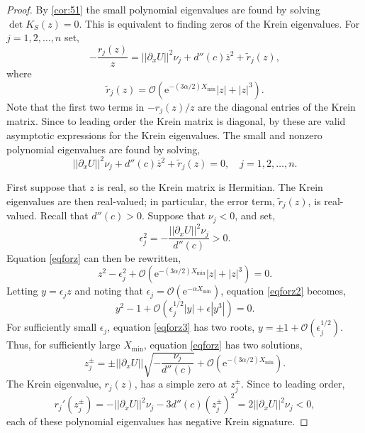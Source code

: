 \documentclass[review,onefignum,onetabnum]{siamart171218}
\def\det{\mathop\mathrm{det}\nolimits}
\newcommand{\rme}{\mathrm{e}}
\newcommand{\vK}{\bm{\mathit{K}}}
\begin{document}

\begin{proof}
By \cref{cor:51} the small polynomial eigenvalues are found by solving $\det\vK_S(z) = 0$. This is equivalent to finding zeros of the Krein eigenvalues. For $j=1,2,\dots,n$ set,
\[
-\frac{r_j(z)}{z}=||\partial_xU||^2 \nu_j + d''(c) \overline{z}^2+\tilde{r}_j(z),
\]
where
\[
\tilde{r}_j(z) = \mathcal{O}(\rme^{-(3 \alpha/2) X_{\mathrm{min}}}|z| + |z|^3).
\]
Note that the first two terms in $-r_j(z)/z$ are the diagonal entries of the Krein matrix. Since to leading order the Krein matrix is diagonal,  by \cite{Ipsen2008} these are valid asymptotic expressions for the Krein eigenvalues. The small and nonzero polynomial eigenvalues are found by solving,
\begin{equation}\label{eqforz}
||\partial_xU||^2 \nu_j + d''(c) \overline{z}^2+\tilde{r}_j(z)=0,\quad j=1,2,\dots,n.
\end{equation}

First suppose that $z$ is real, so the Krein matrix is Hermitian. The Krein eigenvalues are then real-valued; in particular, the error term, $\tilde{r}_j(z)$, is real-valued. Recall that $d''(c)>0$. Suppose that $\nu_j<0$, and set,
\begin{equation}\label{epsilon2}
\epsilon_j^2 = -\frac{||\partial_xU||^2 \nu_j}{d''(c)} > 0.
\end{equation}
Equation \cref{eqforz} can then be rewritten,
\begin{equation}\label{eqforz2}
z^2 - \epsilon_j^2 + \mathcal{O}(\rme^{-(3 \alpha/2) X_{\mathrm{min}}}|z| + |z|^3) = 0.
\end{equation}
Letting $y = \epsilon_j z$ and noting that $\epsilon_j = \mathcal{O}(\rme^{-\alpha X_{\mathrm{min}}})$, equation \cref{eqforz2} becomes,
\begin{equation}\label{eqforz3}
y^2 - 1 + \mathcal{O}(\epsilon_j^{1/2 }|y| + \epsilon|y^3|) = 0.
\end{equation}
For sufficiently small $\epsilon_j$, equation \cref{eqforz3} has two roots, $y = \pm 1 + \mathcal{O}(\epsilon_j^{1/2})$. Thus, for sufficiently large $X_{\mathrm{min}}$, equation \cref{eqforz} has two solutions,
\[
z_j^\pm = \pm ||\partial_xU|| \sqrt{ -\frac{ \nu_j}{d''(c)} } + \mathcal{O}(\rme^{-(3 \alpha/2) X_{\mathrm{min}}}).
\]
The Krein eigenvalue, $r_j(z)$, has a simple zero at $z_j^\pm$. Since to leading order,
\[
r_j'(z_j^\pm)=-||\partial_xU||^2 \nu_j-3d''(c)(z_j^\pm)^2=2||\partial_xU||^2 \nu_j<0,
\]
each of these polynomial eigenvalues has negative Krein signature.


\end{proof}
\end{document}
